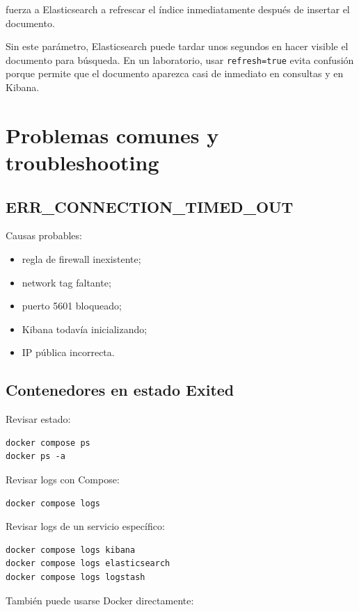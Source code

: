 \documentclass[
  coursetitle={Cómputo Nube y Tecnologías Emergentes},
  coursehours={96},
  coursedate={Verano 2026},
  doctype={Práctica},
  otherlangs={english,french},
  authorname={Lázaro},
  authorsurname={Bustio-Martínez},
  authortitle={PhD},
  role={Profesor Investigador},
  email={lbustio@inaoe.mx},
  phone={5559504000},
  ext={7459},
  institution={Instituto Nacional de Astrofísica, Óptica y Electrónica (INAOE)},
  department={Maestría en Ciencias en Tecnologías de Seguridad},
  address={Luis Enrique Erro 1, Sta. Ma. Tonantzintla, San Andrés Cholula, CP 72840, Puebla, México},
  margin={0.5in}
]{../../lbustio_lecture_notes}
\begin{document}
fuerza a Elasticsearch a refrescar el índice inmediatamente después de insertar el documento.

Sin este parámetro, Elasticsearch puede tardar unos segundos en hacer visible el documento para búsqueda. En un laboratorio, usar \texttt{refresh=true} evita confusión porque permite que el documento aparezca casi de inmediato en consultas y en Kibana.

\section{Problemas comunes y troubleshooting}

\subsection{ERR\_CONNECTION\_TIMED\_OUT}

Causas probables:

\begin{itemize}
    \item regla de firewall inexistente;
    \item network tag faltante;
    \item puerto 5601 bloqueado;
    \item Kibana todavía inicializando;
    \item IP pública incorrecta.
\end{itemize}

\subsection{Contenedores en estado Exited}

Revisar estado:

\begin{lstlisting}
docker compose ps
docker ps -a
\end{lstlisting}

Revisar logs con Compose:

\begin{lstlisting}
docker compose logs
\end{lstlisting}

Revisar logs de un servicio específico:

\begin{lstlisting}
docker compose logs kibana
docker compose logs elasticsearch
docker compose logs logstash
\end{lstlisting}

También puede usarse Docker directamente:
\end{document}

